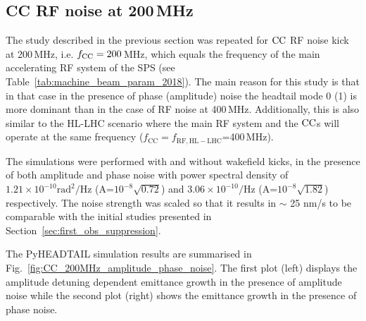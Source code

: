 \subsection{CC RF noise at 200\,MHz}\label{subsec:fcc_200MHz}
 The study described in the previous section was repeated for ${\mathrm{CC}}$ RF noise kick at 200\,MHz, i.e. ${f_\mathrm{CC}}=200$\,MHz, which equals the frequency of the main accelerating RF system of the SPS (see Table~\ref{tab:machine_beam_param_2018}). The main reason for this study is that in that case in the presence of phase (amplitude) noise the headtail mode 0 (1) is more dominant than in the case of RF noise at 400\,MHz. Additionally, this is also similar to the HL-LHC scenario where the main RF system and the ${\mathrm{CC}}$s will operate at the same frequency ($f_\mathrm{CC}=f_\mathrm{RF, HL-LHC}$=400\,MHz).

The simulations were performed with and without wakefield kicks, in the presence of both amplitude and phase noise with power spectral density of $1.21 \times 10^{-10} \mathrm{rad^2/Hz}$ (A=$10^{-8}\sqrt{0.72}$) and $3.06 \times 10^{-10} \mathrm{/Hz}$ (A=$10^{-8}\sqrt{1.82}$) respectively. The noise strength was scaled so that it results in $\sim$ 25 nm/s to be comparable with the initial studies presented in Section~\ref{sec:first_obs_suppression}.

The PyHEADTAIL simulation results are summarised in Fig.~\ref{fig:CC_200MHz_amplitude_phase_noise}. The first plot (left) displays the amplitude detuning dependent emittance growth in the presence of amplitude noise while the second plot (right) shows the emittance growth in the presence of phase noise. 

